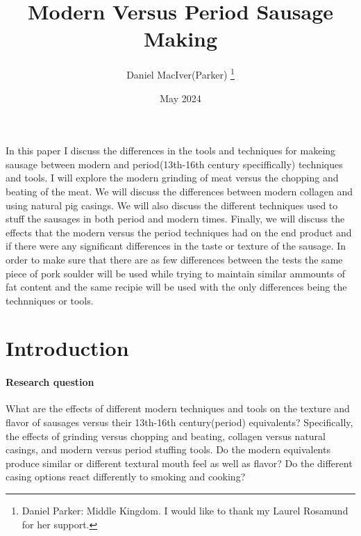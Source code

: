 \documentclass[letterpaper,11pt,leqno]{article}
\begin{document}
\title{Modern Versus Period Sausage Making}

\author{Daniel MacIver(Parker)
%
\thanks{Daniel Parker: Middle Kingdom. I would like to thank my Laurel Rosamund for her support.}}


\date{May 2024}   


\begin{titlepage}
\maketitle

In this paper I discuss the differences in the tools and techniques for makeing sausage between modern and period(13th-16th century speciffically) techniques and tools. I will explore the modern grinding of meat versus the chopping and beating of the meat. We will discuss the differences between modern collagen and using natural pig casings. We will also discuss the different techniques used to stuff the sausages in both period and modern times. Finally, we will discuss the effects that the modern versus the period techniques had on the end product and if there were any significant differences in the taste or texture of the sausage. In order to make sure that there are as few differences between the tests the same piece of pork soulder will be used while trying to maintain similar ammounts of fat content and the same recipie will be used with the only differences being the technniques or tools.

\end{titlepage}

\section{Introduction}\label{s:introduction}
 
\paragraph{Research question} What are the effects of different modern techniques and tools on the texture and flavor of sausages versus their 13th-16th century(period) equivalents? Specifically, the effects of grinding versus chopping and beating, collagen versus natural casings, and modern versus period stuffing tools. Do the modern equivalents produce similar or different textural mouth feel as well as flavor? Do the different casing options react differently to smoking and cooking?
\end{document}
